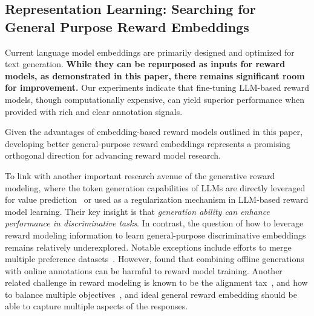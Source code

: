 




\subsection{Representation Learning: Searching for General Purpose Reward Embeddings}
Current language model embeddings are primarily designed and optimized for text generation. \textbf{While they can be repurposed as inputs for reward models, as demonstrated in this paper, there remains significant room for improvement.} Our experiments indicate that fine-tuning LLM-based reward models, though computationally expensive, can yield superior performance when provided with rich and clear annotation signals.

Given the advantages of embedding-based reward models outlined in this paper, developing better general-purpose reward embeddings represents a promising orthogonal direction for advancing reward model research. 

To link with another important research avenue of the generative reward modeling, where the token generation capabilities of LLMs are directly leveraged for value prediction~\citep{mahan2024generative,zhang2024generative} or used as a regularization mechanism in LLM-based reward model learning\citep{yang2024regularizing}. Their key insight is that \textit{generation ability can enhance performance in discriminative tasks}. In contrast, the question of how to leverage reward modeling information to learn general-purpose discriminative embeddings remains relatively underexplored. Notable exceptions include efforts to merge multiple preference datasets~\citep{dong2024rlhf}. However, \citet{sun2024off} found that combining offline generations with online annotations can be harmful to reward model training. Another related challenge in reward modeling is known to be the alignment tax~\citep{lin2024mitigating}, and how to balance multiple objectives~\citep{yang2024rewards,zhou2023beyond}, and ideal general reward embedding should be able to capture multiple aspects of the responses.

